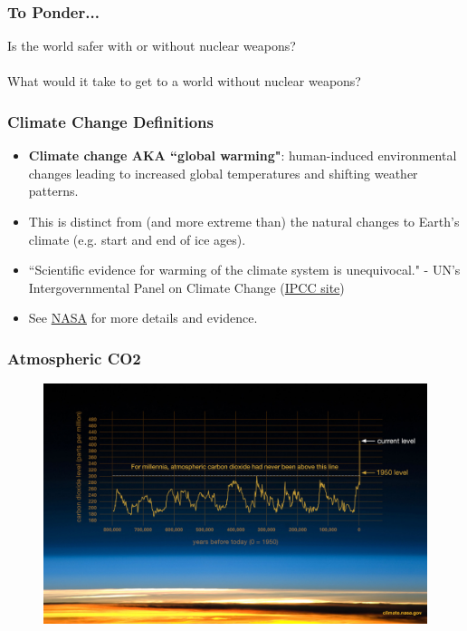 \documentclass{beamer}
\begin{document}
\begin{frame} 
\frametitle{\LARGE{To Ponder...}}
\centering
	\Large{Is the world safer with or without nuclear weapons? \\~\\ What would it take to get to a world without nuclear weapons?}
	
\end{frame}

\begin{frame} 
	\frametitle{\LARGE{Climate Change Definitions}}
	\begin{itemize}
		\item \textbf{Climate change AKA ``global warming"}: human-induced environmental changes leading to increased global temperatures and shifting weather patterns. \pause
		\item This is distinct from (and more extreme than) the natural changes to Earth's climate (e.g. start and end of ice ages).
		\item ``Scientific evidence for warming of the climate system is unequivocal." - UN's Intergovernmental Panel on Climate Change (\href{https://www.ipcc.ch/}{IPCC site})
		\item See \href{https://climate.nasa.gov/evidence/}{NASA} for more details and evidence.
	\end{itemize}
\end{frame}

\begin{frame} 
	\frametitle{\LARGE{Atmospheric CO2}}
	\begin{figure}[ht!]
		\centering
		\includegraphics[width=\textwidth,height=0.9\textheight, keepaspectratio]{NASAco2.jpg}
	\end{figure}
\end{frame}
\end{document}
